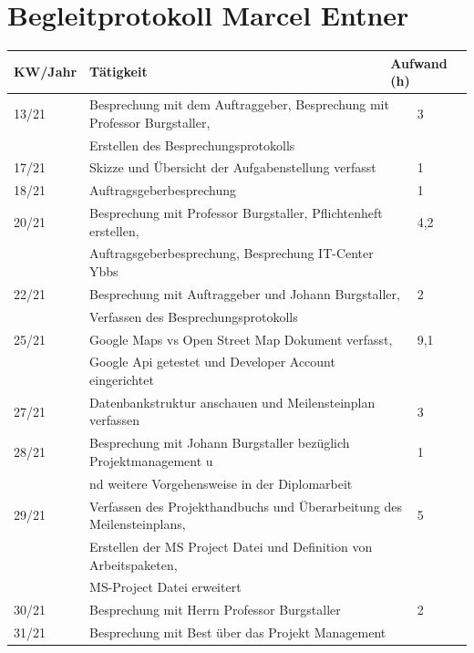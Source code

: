 \section{Begleitprotokoll Marcel Entner}
\begin{table}[h]
	\begin{tabular}{|l|lll|}
		\hline
		KW/Jahr &
		\multicolumn{1}{l|}{Tätigkeit} &
		\multicolumn{2}{l|}{Aufwand (h)} \\ \hline
		13/21 &
		\multicolumn{2}{l|}{Besprechung mit dem Auftraggeber, Besprechung mit Professor Burgstaller, } &
		3 \\  & Erstellen des Besprechungsprotokolls \\ \hline
		17/21 &
		\multicolumn{2}{l|}{Skizze und Übersicht der Aufgabenstellung verfasst} &
		1 \\ \hline
		18/21 &
		\multicolumn{2}{l|}{Auftragsgeberbesprechung} &
		1 \\ \hline
		20/21 &
		\multicolumn{2}{l|}{Besprechung mit Professor Burgstaller, Pflichtenheft erstellen,} &
		4,2 \\ & Auftragsgeberbesprechung, Besprechung IT-Center Ybbs\\ \hline
		22/21 &
		\multicolumn{2}{l|}{Besprechung mit Auftraggeber und Johann Burgstaller, } &
		2 \\&Verfassen des Besprechungsprotokolls\\ \hline
		25/21 &
		\multicolumn{2}{l|}{Google Maps vs Open Street Map Dokument verfasst, } &
		9,1 \\ &Google Api getestet und Developer Account eingerichtet\\ \hline
		27/21 &
		\multicolumn{2}{l|}{Datenbankstruktur anschauen und Meilensteinplan verfassen} &
		3 \\ \hline
		28/21 &
		\multicolumn{2}{l|}{Besprechung mit Johann Burgstaller bezüglich Projektmanagement u} &
		1 \\ &nd weitere Vorgehensweise in der Diplomarbeit\\ \hline
		29/21 &
		\multicolumn{2}{l|}{Verfassen des Projekthandbuchs und Überarbeitung des Meilensteinplans, } &
		5 \\ & Erstellen der MS Project Datei und Definition von Arbeitspaketen, \\ &MS-Project Datei erweitert\\\hline
		30/21 &
		\multicolumn{2}{l|}{Besprechung mit Herrn Professor Burgstaller} &
		2 \\ \hline
		31/21 &
		\multicolumn{2}{l|}{Besprechung mit Best über das Projekt Management} &

\end{tabular}
\end{table}
